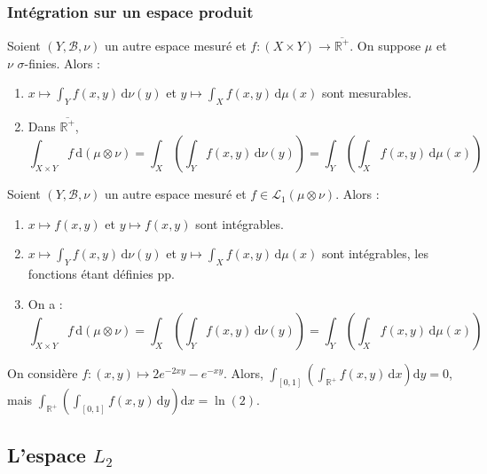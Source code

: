 	\subsubsection{Intégration sur un espace produit}


	\begin{theorem}
		Soient $(Y, \mathcal{B}, \nu)$ un autre espace mesuré et $f : (X \times Y) \rightarrow \overline{\mathbb{R}^+}$. On suppose $\mu$ et $\nu$ $\sigma$-finies. Alors :
		\begin{enumerate}[label=(\roman*)]
			\item $x \mapsto \int_Y f(x,y) \, \mathrm{d}\nu(y)$ et $y \mapsto \int_X f(x,y) \, \mathrm{d}\mu(x)$ sont mesurables.
			\item Dans $\overline{\mathbb{R}^+}$,
			\[ \int_{X \times Y} f \, \mathrm{d}(\mu \otimes \nu) = \int_X \left( \int_Y f(x,y) \, \mathrm{d}\nu(y) \right) = \int_Y \left( \int_X f(x,y) \, \mathrm{d}\mu(x) \right) \]
		\end{enumerate}
	\end{theorem}

	\begin{theorem}
		Soient $(Y, \mathcal{B}, \nu)$ un autre espace mesuré et $f \in \mathcal{L}_1 (\mu \otimes \nu)$. Alors :
		\begin{enumerate}[label=(\roman*)]
			\item $x \mapsto f(x,y)$ et $y \mapsto f(x,y)$ sont intégrables.
			\item $x \mapsto \int_Y f(x,y) \, \mathrm{d}\nu(y)$ et $y \mapsto \int_X f(x,y) \, \mathrm{d}\mu(x)$ sont intégrables, les fonctions étant définies pp.
			\item On a :
			\[ \int_{X \times Y} f \, \mathrm{d}(\mu \otimes \nu) = \int_X \left( \int_Y f(x,y) \, \mathrm{d}\nu(y) \right) = \int_Y \left( \int_X f(x,y) \, \mathrm{d}\mu(x) \right) \]
		\end{enumerate}
	\end{theorem}

	\begin{cexample}
		On considère $f : (x,y) \mapsto 2e^{-2xy} - e^{-xy}$. Alors, $\int_{[0,1]} \left( \int_{\mathbb{R}^+} f(x,y) \, \mathrm{d}x \right) \mathrm{d}y = 0$, mais $\int_{\mathbb{R}^+} \left( \int_{[0,1]} f(x,y) \, \mathrm{d}y \right) \mathrm{d}x = \ln(2)$.
	\end{cexample}

	\subsection{L'espace \texorpdfstring{$L_2$}{L₂}}

